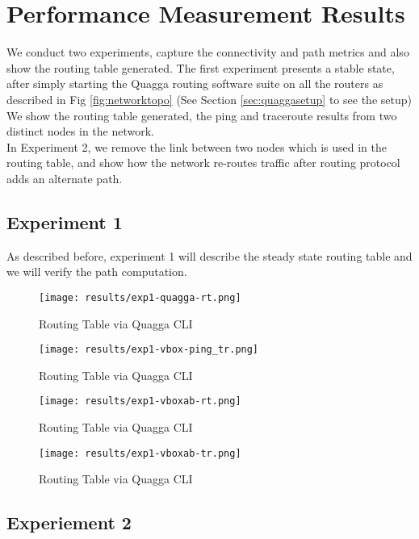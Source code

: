 \documentclass{article}
\begin{document}
\section{Performance Measurement Results}
We conduct two experiments, capture the connectivity and path metrics and also show the routing table generated.
The first experiment presents a stable state, after simply starting the Quagga routing software suite on all the routers as described in
Fig \ref{fig:networktopo} (See Section \ref{sec:quaggasetup} to see the setup)
We show the routing table generated, the ping and traceroute results from two distinct nodes in the network.\\
In Experiment 2, we remove the link between two nodes which is used in the routing table, and show how the network re-routes traffic 
after routing protocol adds an alternate path.

\subsection{Experiment 1}
As described before, experiment 1 will describe the steady state routing table and we will verify the path
computation.
\begin{figure}[ht!]
  \centering
  \texttt{[image: results/exp1-quagga-rt.png]}
  \caption{Routing Table via Quagga CLI}
  \label{fig:exp1-quagga-rt}
\end{figure}

\begin{figure}[ht!]
  \centering
  \texttt{[image: results/exp1-vbox-ping\_tr.png]}
  \caption{Routing Table via Quagga CLI}
  \label{fig:exp1-vbox-ping_tr}
\end{figure}

\begin{figure}[ht!]
  \centering
  \texttt{[image: results/exp1-vboxab-rt.png]}
  \caption{Routing Table via Quagga CLI}
  \label{fig:exp1-vboxab-rt}
\end{figure}

\begin{figure}[ht!]
  \centering
  \texttt{[image: results/exp1-vboxab-tr.png]}
  \caption{Routing Table via Quagga CLI}
  \label{fig:exp1-vboxab-tr}
\end{figure}

\subsection{Experiement 2}
\end{document}
